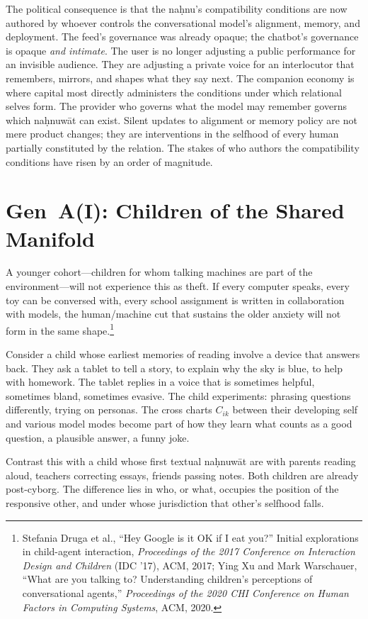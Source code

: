 The political consequence is that the na\d{h}nu's compatibility conditions are now authored by whoever controls the conversational model's alignment, memory, and deployment. The feed's governance was already opaque; the chatbot's governance is opaque \emph{and intimate}. The user is no longer adjusting a public performance for an invisible audience. They are adjusting a private voice for an interlocutor that remembers, mirrors, and shapes what they say next. The companion economy is where capital most directly administers the conditions under which relational selves form. The provider who governs what the model may remember governs which na\d{h}nuw\={a}t can exist. Silent updates to alignment or memory policy are not mere product changes; they are interventions in the selfhood of every human partially constituted by the relation. The stakes of who authors the compatibility conditions have risen by an order of magnitude.

\section{Gen~A(I): Children of the Shared Manifold}

A younger cohort---children for whom talking machines are part of the environment---will not experience this as theft. If every computer speaks, every toy can be conversed with, every school assignment is written in collaboration with models, the human/machine cut that sustains the older anxiety will not form in the same shape.\footnote{Stefania Druga et al., ``Hey Google is it OK if I eat you?'' Initial explorations in child-agent interaction, \emph{Proceedings of the 2017 Conference on Interaction Design and Children} (IDC '17), ACM, 2017; Ying Xu and Mark Warschauer, ``What are you talking to? Understanding children's perceptions of conversational agents,'' \emph{Proceedings of the 2020 CHI Conference on Human Factors in Computing Systems}, ACM, 2020.}

Consider a child whose earliest memories of reading involve a device that answers back. They ask a tablet to tell a story, to explain why the sky is blue, to help with homework. The tablet replies in a voice that is sometimes helpful, sometimes bland, sometimes evasive. The child experiments: phrasing questions differently, trying on personas. The cross charts $C_{ik}$ between their developing self and various model modes become part of how they learn what counts as a good question, a plausible answer, a funny joke.

Contrast this with a child whose first textual na\d{h}nuw\={a}t are with parents reading aloud, teachers correcting essays, friends passing notes. Both children are already post-cyborg. The difference lies in who, or what, occupies the position of the responsive other, and under whose jurisdiction that other's selfhood falls.

